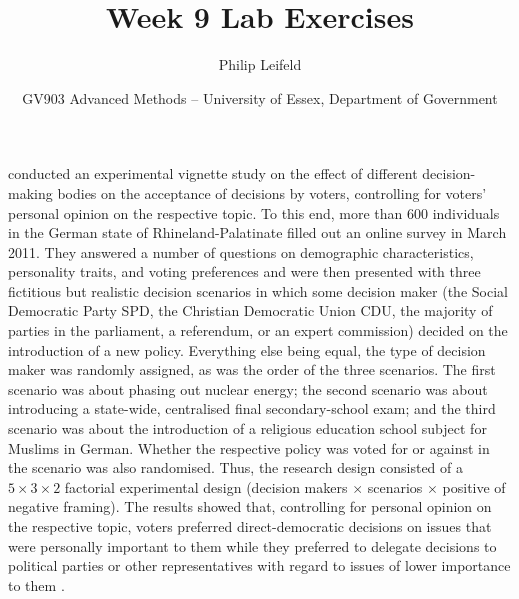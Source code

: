 \documentclass[a4paper,11pt]{article}
\title{Week 9 Lab Exercises}
\author{Philip Leifeld}
\date{GV903 Advanced Methods -- University of Essex, Department of Government}
\begin{document}
\maketitle

\noindent \citet{towfigh2016direct} conducted an experimental vignette study on the effect of different decision-making bodies on the acceptance of decisions by voters, controlling for voters' personal opinion on the respective topic. To this end, more than 600 individuals in the German state of Rhineland-Palatinate filled out an online survey in March 2011. They answered a number of questions on demographic characteristics, personality traits, and voting preferences and were then presented with three fictitious but realistic decision scenarios in which some decision maker (the Social Democratic Party SPD, the Christian Democratic Union CDU, the majority of parties in the parliament, a referendum, or an expert commission) decided on the introduction of a new policy. Everything else being equal, the type of decision maker was randomly assigned, as was the order of the three scenarios. The first scenario was about phasing out nuclear energy; the second scenario was about introducing a state-wide, centralised final secondary-school exam; and the third scenario was about the introduction of a religious education school subject for Muslims in German. Whether the respective policy was voted for or against in the scenario was also randomised. Thus, the research design consisted of a $5 \times 3 \times 2$ factorial experimental design (decision makers $\times$ scenarios $\times$ positive of negative framing). The results showed that, controlling for personal opinion on the respective topic, voters preferred direct-democratic decisions on issues that were personally important to them while they preferred to delegate decisions to political parties or other representatives with regard to issues of lower importance to them \citep{towfigh2016direct}.
\end{document}
